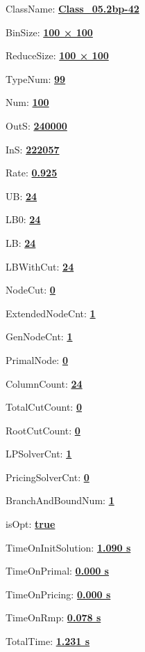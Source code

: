 \documentclass[11pt]{article}
\begin{document}
\pagestyle{empty}


ClassName: \underline{\textbf{Class_05.2bp-42}}
\par
BinSize: \underline{\textbf{100 × 100}}
\par
ReduceSize: \underline{\textbf{100 × 100}}
\par
TypeNum: \underline{\textbf{99}}
\par
Num: \underline{\textbf{100}}
\par
OutS: \underline{\textbf{240000}}
\par
InS: \underline{\textbf{222057}}
\par
Rate: \underline{\textbf{0.925}}
\par
UB: \underline{\textbf{24}}
\par
LB0: \underline{\textbf{24}}
\par
LB: \underline{\textbf{24}}
\par
LBWithCut: \underline{\textbf{24}}
\par
NodeCut: \underline{\textbf{0}}
\par
ExtendedNodeCnt: \underline{\textbf{1}}
\par
GenNodeCnt: \underline{\textbf{1}}
\par
PrimalNode: \underline{\textbf{0}}
\par
ColumnCount: \underline{\textbf{24}}
\par
TotalCutCount: \underline{\textbf{0}}
\par
RootCutCount: \underline{\textbf{0}}
\par
LPSolverCnt: \underline{\textbf{1}}
\par
PricingSolverCnt: \underline{\textbf{0}}
\par
BranchAndBoundNum: \underline{\textbf{1}}
\par
isOpt: \underline{\textbf{true}}
\par
TimeOnInitSolution: \underline{\textbf{1.090 s}}
\par
TimeOnPrimal: \underline{\textbf{0.000 s}}
\par
TimeOnPricing: \underline{\textbf{0.000 s}}
\par
TimeOnRmp: \underline{\textbf{0.078 s}}
\par
TotalTime: \underline{\textbf{1.231 s}}
\par
\newpage


\end{document}
